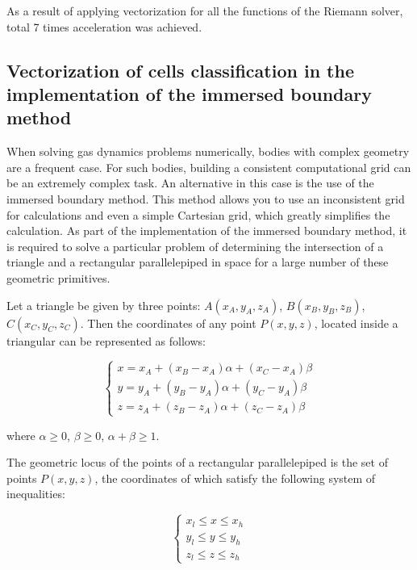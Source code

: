 \documentclass[
11pt,%
tightenlines,%
twoside,%
onecolumn,%
nofloats,%
nobibnotes,%
nofootinbib,%
superscriptaddress,%
noshowpacs,%
centertags]%
{revtex4}
\begin{document}
As a result of applying vectorization for all the functions of the Riemann solver, total 7 times acceleration was achieved.

\subsection{Vectorization of cells classification in the implementation of the immersed boundary method}

When solving gas dynamics problems numerically, bodies with complex geometry are a frequent case.
For such bodies, building a consistent computational grid can be an extremely complex task.
An alternative in this case is the use of the immersed boundary method.
This method allows you to use an inconsistent grid for calculations and even a simple Cartesian grid, which greatly simplifies the calculation.
As part of the implementation of the immersed boundary method, it is required to solve a particular problem of determining the intersection of a triangle and a rectangular parallelepiped in space for a large number of these geometric primitives.

Let a triangle be given by three points: $A(x_A, y_A, z_A)$, $B(x_B, y_B, z_B)$, $C(x_C, y_C, z_C)$.
Then the coordinates of any point $P(x, y, z)$, located inside a triangular can be represented as follows:

\begin{equation}
\begin{cases}
x = x_A + (x_B - x_A)\alpha + (x_C - x_A)\beta \\
y = y_A + (y_B - y_A)\alpha + (y_C - y_A)\beta \\
z = z_A + (z_B - z_A)\alpha + (z_C - z_A)\beta
\end{cases}
\end{equation}

where $\alpha \ge 0$, $\beta \ge 0$, $\alpha + \beta \ge 1$.

The geometric locus of the points of a rectangular parallelepiped is the set of points $P(x, y, z)$, the coordinates of which satisfy the following system of inequalities:

\begin{equation}
\begin{cases}
x_l \le x \le x_h \\
y_l \le y \le y_h \\
z_l \le z \le z_h
\end{cases}
\end{equation}
\end{document}
